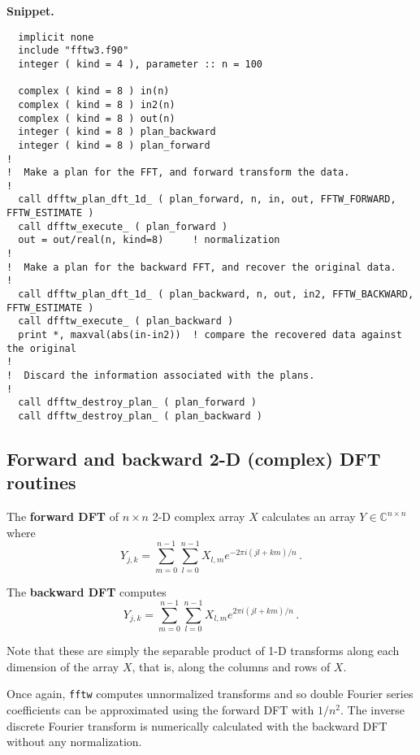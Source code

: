 \documentclass[11pt]{article}
\begin{document}
\textbf{Snippet.}
\begin{verbatim}
  implicit none
  include "fftw3.f90"
  integer ( kind = 4 ), parameter :: n = 100

  complex ( kind = 8 ) in(n)
  complex ( kind = 8 ) in2(n)
  complex ( kind = 8 ) out(n)
  integer ( kind = 8 ) plan_backward
  integer ( kind = 8 ) plan_forward
!
!  Make a plan for the FFT, and forward transform the data.
!
  call dfftw_plan_dft_1d_ ( plan_forward, n, in, out, FFTW_FORWARD, FFTW_ESTIMATE )
  call dfftw_execute_ ( plan_forward )
  out = out/real(n, kind=8)     ! normalization
!
!  Make a plan for the backward FFT, and recover the original data.
!
  call dfftw_plan_dft_1d_ ( plan_backward, n, out, in2, FFTW_BACKWARD, FFTW_ESTIMATE )
  call dfftw_execute_ ( plan_backward )
  print *, maxval(abs(in-in2))  ! compare the recovered data against the original
!
!  Discard the information associated with the plans.
!
  call dfftw_destroy_plan_ ( plan_forward )
  call dfftw_destroy_plan_ ( plan_backward )
\end{verbatim}

\subsection{Forward and backward 2-D (complex) DFT routines}
\label{sec:orgc22eeb7}
The \textbf{forward DFT} of \(n \times n\) 2-D complex array \(X\) calculates an
array \(Y \in \mathbb{C}^{n \times n}\) where
\[
Y_{j,k} = \sum_{m=0}^{n-1} \sum_{l=0}^{n-1} X_{l,m} e^{-2\pi i (jl+km)/n} \,.
\]

The \textbf{backward DFT} computes
\[
Y_{j,k} = \sum_{m=0}^{n-1} \sum_{l=0}^{n-1} X_{l,m} e^{2\pi i (jl+km)/n} \,.
\]

Note that these are simply the separable product of 1-D transforms
along each dimension of the array \(X\), that is, along the columns and
rows of \(X\).

Once again, \texttt{fftw} computes unnormalized transforms and so double
Fourier series coefficients can be approximated using the forward DFT
with \(1/n^2\). The inverse discrete Fourier transform is numerically
calculated with the backward DFT without any normalization.
\end{document}

